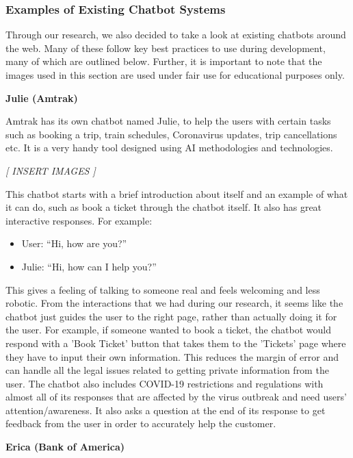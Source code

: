 \documentclass[titlepage, 12pt]{article}
\begin{document}
\subsubsection{Examples of Existing Chatbot Systems}

Through our research, we also decided to take a look at existing chatbots around the web. Many of these follow key best practices to use during development, many of which are outlined below. Further, it is important to note that the images used in this section are used under fair use for educational purposes only.

\textbf{Julie (Amtrak)}

Amtrak has its own chatbot named Julie, to help the users with certain tasks such as booking a trip, train schedules, Coronavirus updates, trip cancellations etc. It is a very handy tool designed using AI methodologies and technologies.

\begin{center}\emph{[ INSERT IMAGES ]}\end{center}

This chatbot starts with a brief introduction about itself and an example of what it can do, such as book a ticket through the chatbot itself. It also has great interactive responses. For example:

\begin{itemize}
    \item User: “Hi, how are you?”
    \item Julie: “Hi, how can I help you?”
\end{itemize}

This gives a feeling of talking to someone real and feels welcoming and less robotic. From the interactions that we had during our research, it seems like the chatbot just guides the user to the right page, rather than actually doing it for the user. For example, if someone wanted to book a ticket, the chatbot would respond with a 'Book Ticket' button that takes them to the 'Tickets' page where they have to input their own information. This reduces the margin of error and can handle all the legal issues related to getting private information from the user. The chatbot also includes COVID-19 restrictions and regulations with almost all of its responses that are affected by the virus outbreak and need users' attention/awareness. It also asks a question at the end of its response to get feedback from the user in order to accurately help the customer.

\textbf{Erica (Bank of America)}
\end{document}
